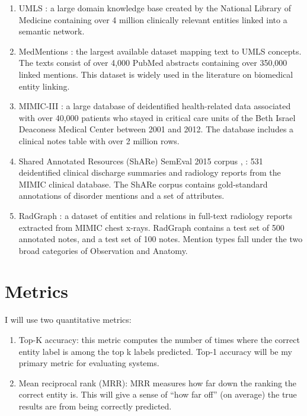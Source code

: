 \documentclass{article}
\begin{document}
\begin{enumerate}
  \item UMLS \cite{bodenreider_unified_2004}: a large domain knowledge base created by the National Library of Medicine containing over 4 million clinically relevant entities linked into a semantic network.
  \item MedMentions \cite{mohan_medmentions_2019}: the largest available dataset mapping text to UMLS concepts. The texts consist of over 4,000 PubMed abstracts containing over 350,000 linked mentions. This dataset is widely used in the literature on biomedical entity linking.
  \item MIMIC-III \cite{goldberger_physiobank_2000}: a large database of deidentified health-related data associated with over 40,000 patients who stayed in critical care units of the Beth Israel Deaconess Medical Center between 2001 and 2012. The database includes a clinical notes table with over 2 million rows.
  \item Shared Annotated Resources (ShARe) SemEval 2015 corpus \cite{savova_guergana_analysis_nodate}, \cite{pradhan_semeval-2014_2014}: 531 deidentified clinical discharge summaries and radiology reports from the MIMIC clinical database. The ShARe corpus contains gold-standard annotations of disorder mentions and a set of attributes.
  \item RadGraph \cite{jain_saahil_radgraph_nodate}: a dataset of entities and relations in full-text radiology reports extracted from MIMIC chest x-rays. RadGraph contains a test set of 500 annotated notes, and a test set of 100 notes. Mention types fall under the two broad categories of Observation and Anatomy.
\end{enumerate}


\section{Metrics}

I will use two quantitative metrics:

\begin{enumerate}
  \item Top-K accuracy: this metric computes the number of times where the correct entity label is among the top k labels predicted. Top-1 accuracy will be my primary metric for evaluating systems.
  \item Mean reciprocal rank (MRR): MRR measures how far down the ranking the correct entity is. This will give a sense of ``how far off'' (on average) the true results are from being correctly predicted.
\end{enumerate}
\end{document}
